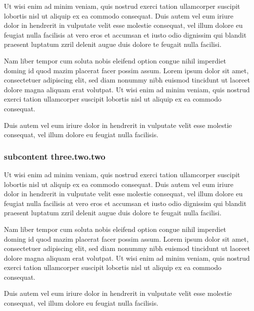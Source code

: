 Ut wisi enim ad minim veniam, quis nostrud exerci tation ullamcorper suscipit
lobortis nisl ut aliquip ex ea commodo consequat. Duis autem vel eum iriure
dolor in hendrerit in vulputate velit esse molestie consequat, vel illum dolore
eu feugiat nulla facilisis at vero eros et accumsan et iusto odio dignissim qui
blandit praesent luptatum zzril delenit augue duis dolore te feugait nulla
facilisi.

Nam liber tempor cum soluta nobis eleifend option congue nihil imperdiet doming
id quod mazim placerat facer possim assum. Lorem ipsum dolor sit amet,
consectetuer adipiscing elit, sed diam nonummy nibh euismod tincidunt ut laoreet
dolore magna aliquam erat volutpat. Ut wisi enim ad minim veniam, quis nostrud
exerci tation ullamcorper suscipit lobortis nisl ut aliquip ex ea commodo
consequat.

Duis autem vel eum iriure dolor in hendrerit in vulputate velit esse molestie
consequat, vel illum dolore eu feugiat nulla facilisis.
 \subsubsection{subcontent three.two.two}   

Ut wisi enim ad minim veniam, quis nostrud exerci tation ullamcorper suscipit
lobortis nisl ut aliquip ex ea commodo consequat. Duis autem vel eum iriure
dolor in hendrerit in vulputate velit esse molestie consequat, vel illum dolore
eu feugiat nulla facilisis at vero eros et accumsan et iusto odio dignissim qui
blandit praesent luptatum zzril delenit augue duis dolore te feugait nulla
facilisi.
 
Nam liber tempor cum soluta nobis eleifend option congue nihil imperdiet doming
id quod mazim placerat facer possim assum. Lorem ipsum dolor sit amet,
consectetuer adipiscing elit, sed diam nonummy nibh euismod tincidunt ut laoreet
dolore magna aliquam erat volutpat. Ut wisi enim ad minim veniam, quis nostrud
exerci tation ullamcorper suscipit lobortis nisl ut aliquip ex ea commodo
consequat.

Duis autem vel eum iriure dolor in hendrerit in vulputate velit esse molestie
consequat, vel illum dolore eu feugiat nulla facilisis.

